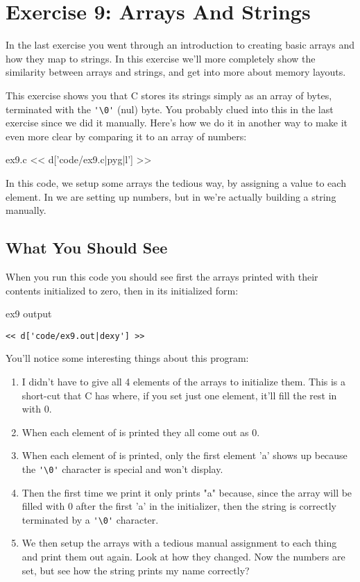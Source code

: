 \chapter{Exercise 9: Arrays And Strings}

In the last exercise you went through an introduction to creating basic
arrays and how they map to strings.  In this exercise we'll more completely
show the similarity between arrays and strings, and get into more about
memory layouts.

This exercise shows you that C stores its strings simply as an array
of bytes, terminated with the \verb|'\0'| (nul) byte.  You probably clued
into this in the last exercise since we did it manually.  Here's
how we do it in another way to make it even more clear by comparing it
to an array of numbers:

\begin{code}{ex9.c}
<< d['code/ex9.c|pyg|l'] >>
\end{code}

In this code, we setup some arrays the tedious way, by assigning a value
to each element.  In  we are setting up numbers, but in
 we're actually building a string manually.

\section{What You Should See}

When you run this code you should see first the arrays printed with
their contents initialized to zero, then in its initialized form:

\begin{code}{ex9 output}
\begin{lstlisting}
<< d['code/ex9.out|dexy'] >>
\end{lstlisting}
\end{code}

You'll notice some interesting things about this program:

\begin{enumerate}
\item I didn't have to give all 4 elements of the arrays to initialize them.
    This is a short-cut that C has where, if you set just one element, it'll
    fill the rest in with 0.
\item When each element of  is printed they all come out as
    0.
\item When each element of  is printed, only the first element 'a'
    shows up because the \verb|'\0'| character is special and won't display.
\item Then the first time we print  it only prints "a" because,
    since the array will be filled with 0 after the first 'a' in the 
    initializer, then the string is correctly terminated by a \verb|'\0'|
    character.
\item We then setup the arrays with a tedious manual assignment to each thing
    and print them out again.  Look at how they changed.  Now the numbers
    are set, but see how the  string prints my name correctly?
\end{enumerate}

